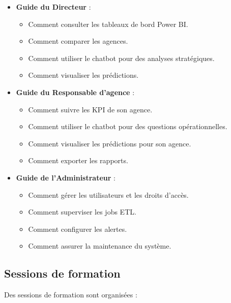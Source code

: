\begin{itemize}
    \item \textbf{Guide du Directeur} :
        \begin{itemize}
            \item Comment consulter les tableaux de bord Power BI.
            \item Comment comparer les agences.
            \item Comment utiliser le chatbot pour des analyses stratégiques.
            \item Comment visualiser les prédictions.
        \end{itemize}
    \item \textbf{Guide du Responsable d'agence} :
        \begin{itemize}
            \item Comment suivre les KPI de son agence.
            \item Comment utiliser le chatbot pour des questions opérationnelles.
            \item Comment visualiser les prédictions pour son agence.
            \item Comment exporter les rapports.
        \end{itemize}
    \item \textbf{Guide de l'Administrateur} :
        \begin{itemize}
            \item Comment gérer les utilisateurs et les droits d'accès.
            \item Comment superviser les jobs ETL.
            \item Comment configurer les alertes.
            \item Comment assurer la maintenance du système.
        \end{itemize}
\end{itemize}

\subsection{Sessions de formation}

Des sessions de formation sont organisées :

